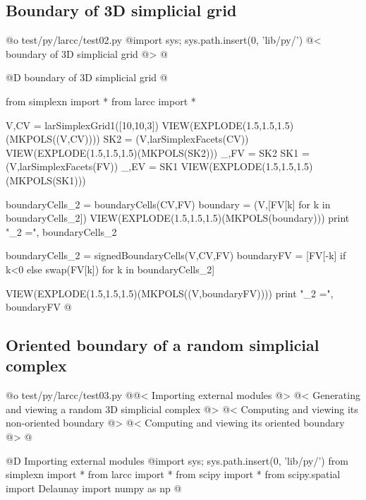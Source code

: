 \documentclass[11pt,oneside]{article}	%
\begin{document}
\subsection{Boundary of 3D simplicial grid}

@o test/py/larcc/test02.py
@{import sys; sys.path.insert(0, 'lib/py/')
@< boundary of 3D simplicial grid @>
@}

@D boundary of 3D simplicial grid
@{from simplexn import *
from larcc import *

V,CV = larSimplexGrid1([10,10,3])
VIEW(EXPLODE(1.5,1.5,1.5)(MKPOLS((V,CV))))
SK2 = (V,larSimplexFacets(CV))
VIEW(EXPLODE(1.5,1.5,1.5)(MKPOLS(SK2)))
_,FV = SK2
SK1 = (V,larSimplexFacets(FV))
_,EV = SK1
VIEW(EXPLODE(1.5,1.5,1.5)(MKPOLS(SK1)))

boundaryCells_2 = boundaryCells(CV,FV)
boundary = (V,[FV[k] for k in boundaryCells_2])
VIEW(EXPLODE(1.5,1.5,1.5)(MKPOLS(boundary)))
print "\nboundaryCells_2 =\n", boundaryCells_2

boundaryCells_2 = signedBoundaryCells(V,CV,FV)
boundaryFV = [FV[-k] if k<0 else swap(FV[k]) for k in boundaryCells_2]

VIEW(EXPLODE(1.5,1.5,1.5)(MKPOLS((V,boundaryFV))))
print "\nboundaryCells_2 =\n", boundaryFV
@}


\subsection{Oriented boundary of a random simplicial complex}


@o test/py/larcc/test03.py
@{@< Importing external modules @>
@< Generating and viewing a random 3D simplicial complex @>
@< Computing and viewing its non-oriented boundary @>
@< Computing and viewing its oriented boundary @>
@}


@D Importing external modules
@{import sys; sys.path.insert(0, 'lib/py/')
from simplexn import *
from larcc import *
from scipy import *
from scipy.spatial import Delaunay
import numpy as np
@}
\end{document}
